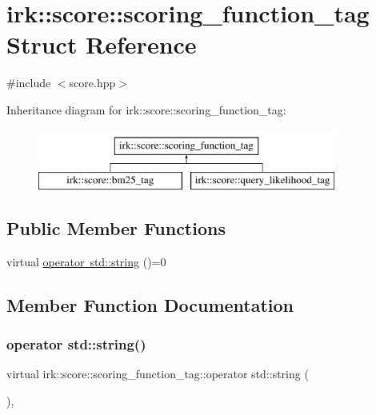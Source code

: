 \hypertarget{structirk_1_1score_1_1scoring__function__tag}{}\section{irk\+:\+:score\+:\+:scoring\+\_\+function\+\_\+tag Struct Reference}
\label{structirk_1_1score_1_1scoring__function__tag}


{\ttfamily \#include $<$score.\+hpp$>$}

Inheritance diagram for irk\+:\+:score\+:\+:scoring\+\_\+function\+\_\+tag\+:\begin{figure}[H]
\begin{center}
\leavevmode
\includegraphics[height=2.000000cm]{structirk_1_1score_1_1scoring__function__tag}
\end{center}
\end{figure}
\subsection*{Public Member Functions}
\begin{DoxyCompactItemize}
\item 
virtual \mbox{\hyperlink{structirk_1_1score_1_1scoring__function__tag_a718047dd6d5a9edd7b76ec55f2599c49}{operator std\+::string}} ()=0
\end{DoxyCompactItemize}


\subsection{Member Function Documentation}
\mbox{\label{structirk_1_1score_1_1scoring__function__tag_a718047dd6d5a9edd7b76ec55f2599c49}} 
\subsubsection{\texorpdfstring{operator std\+::string()}{operator std::string()}}
{\footnotesize\ttfamily virtual irk\+::score\+::scoring\+\_\+function\+\_\+tag\+::operator std\+::string (\begin{DoxyParamCaption}{ }\end{DoxyParamCaption})\hspace{0.3cm}{\ttfamily [explicit]}, {}}



